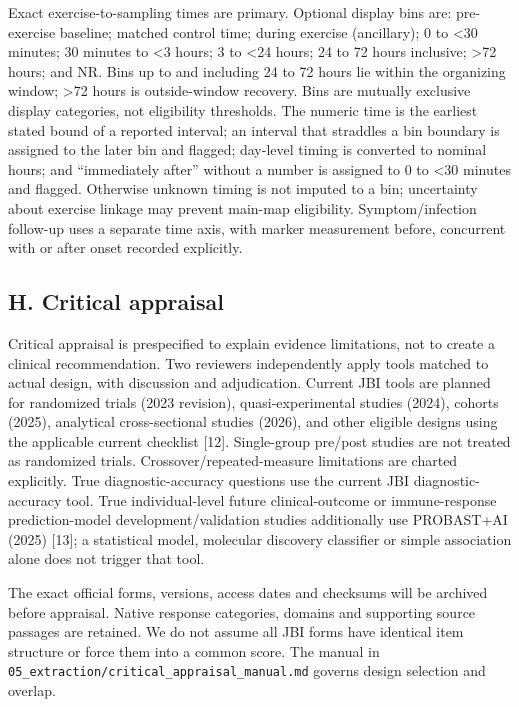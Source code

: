 \documentclass[
  11pt,
  a4paper,
]{article}
\begin{document}
Exact exercise-to-sampling times are primary. Optional display bins are:
pre-exercise baseline; matched control time; during exercise
(ancillary); 0 to \textless30 minutes; 30 minutes to \textless3 hours; 3
to \textless24 hours; 24 to 72 hours inclusive; \textgreater72 hours;
and NR. Bins up to and including 24 to 72 hours lie within the
organizing window; \textgreater72 hours is outside-window recovery. Bins
are mutually exclusive display categories, not eligibility thresholds.
The numeric time is the earliest stated bound of a reported interval; an
interval that straddles a bin boundary is assigned to the later bin and
flagged; day-level timing is converted to nominal hours; and
``immediately after'' without a number is assigned to 0 to \textless30
minutes and flagged. Otherwise unknown timing is not imputed to a bin;
uncertainty about exercise linkage may prevent main-map eligibility.
Symptom/infection follow-up uses a separate time axis, with marker
measurement before, concurrent with or after onset recorded explicitly.

\subsection{H. Critical appraisal}\label{h.-critical-appraisal}

Critical appraisal is prespecified to explain evidence limitations, not
to create a clinical recommendation. Two reviewers independently apply
tools matched to actual design, with discussion and adjudication.
Current JBI tools are planned for randomized trials (2023 revision),
quasi-experimental studies (2024), cohorts (2025), analytical
cross-sectional studies (2026), and other eligible designs using the
applicable current checklist {[}12{]}. Single-group pre/post studies are
not treated as randomized trials. Crossover/repeated-measure limitations
are charted explicitly. True diagnostic-accuracy questions use the
current JBI diagnostic-accuracy tool. True individual-level future
clinical-outcome or immune-response prediction-model
development/validation studies additionally use PROBAST+AI (2025)
{[}13{]}; a statistical model, molecular discovery classifier or simple
association alone does not trigger that tool.

The exact official forms, versions, access dates and checksums will be
archived before appraisal. Native response categories, domains and
supporting source passages are retained. We do not assume all JBI forms
have identical item structure or force them into a common score. The
manual in \texttt{05\_extraction/critical\_appraisal\_manual.md} governs
design selection and overlap.
\end{document}
